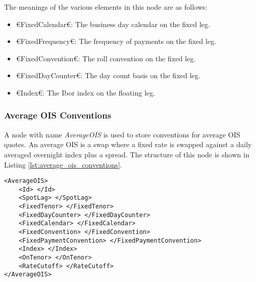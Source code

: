 The meanings of the various elements in this node are as follows:
\begin{itemize}
\item €FixedCalendar€: The business day calendar on the fixed leg.
\item €FixedFrequency€: The frequency of payments on the fixed leg.
\item €FixedConvention€: The roll convention on the fixed leg.
\item €FixedDayCounter€: The day count basis on the fixed leg.
\item €Index€: The Ibor index on the floating leg.
\end{itemize}

\subsubsection{Average OIS Conventions}
A node with name \emph{AverageOIS} is used to store conventions for average OIS quotes. An average OIS is a swap where a 
fixed rate is swapped against a daily averaged overnight index plus a spread. The structure of this node is shown in 
Listing \ref{lst:average_ois_conventions}.

\begin{lstlisting}[caption={Average OIS conventions}, label=lst:average_ois_conventions]
<AverageOIS>
	<Id> </Id>
	<SpotLag> </SpotLag>
	<FixedTenor> </FixedTenor>
	<FixedDayCounter> </FixedDayCounter>
	<FixedCalendar> </FixedCalendar>
	<FixedConvention> </FixedConvention>
	<FixedPaymentConvention> </FixedPaymentConvention>
	<Index> </Index>
	<OnTenor> </OnTenor>
	<RateCutoff> </RateCutoff>
</AverageOIS>
\end{lstlisting}

